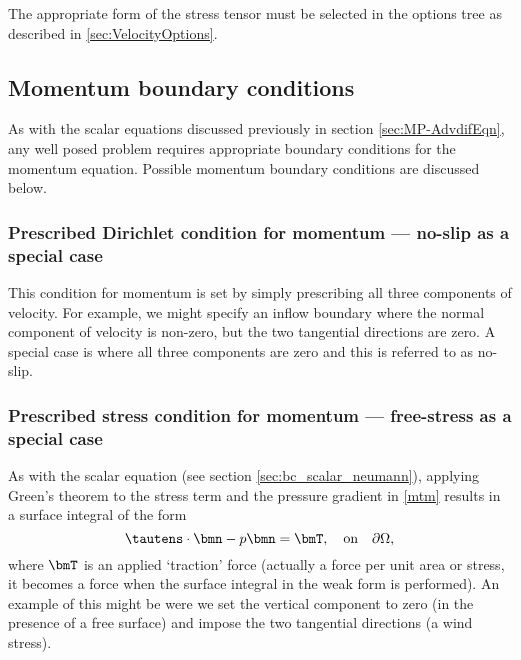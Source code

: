 The appropriate form of the stress tensor must be selected in the options tree as described in \ref{sec:VelocityOptions}.

\subsection{Momentum boundary conditions} \label{sec:BCs-mom}


As with the scalar equations discussed previously in section \ref{sec:MP-AdvdifEqn}, any well posed problem requires appropriate boundary conditions for the momentum equation. Possible momentum boundary conditions are discussed below.

\subsubsection{Prescribed Dirichlet condition for momentum --- no-slip as a special case}\label{sec:bc_vector_dirichlet}

This condition for momentum is set by simply prescribing all three components of
velocity. For example, we might specify an inflow boundary where the normal component
of velocity is non-zero, but the two tangential directions are zero. A special case is
where all three components are zero and this is referred to as no-slip.

\subsubsection{Prescribed stress condition for momentum --- free-stress as a special case}\label{sec:bc_vector_stress}

As with the scalar equation (see section \ref{sec:bc_scalar_neumann}), applying Green's theorem to the stress term and the pressure
gradient in \eqref{mtm} results in a surface integral of the form
\begin{equation}\label{StressBC}
\tautens\cdot\bmn - p\bmn = \bmT,\quad \textrm{on}\quad \partial\Omega,
\end{equation}
where $\bmT$ is an applied `traction' force (actually a force per unit area or stress, it becomes
a force when the surface integral in the weak form is performed). An example of this might be were we set the vertical
component to zero (in the presence of a free surface) and impose the two tangential directions
(\eg a wind stress).

